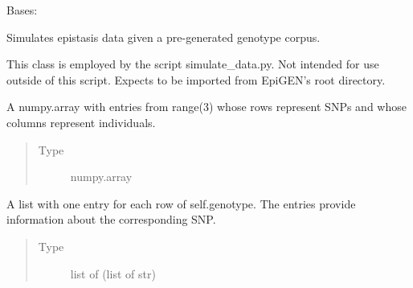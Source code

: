 \documentclass[a4paper,10pt,english]{sphinxhowto}
\begin{document}
\begin{fulllineitems}
\label{\detokenize{utils:utils.data_simulator.DataSimulator}}
Bases: 

Simulates epistasis data given a pre-generated genotype corpus.

This class is employed by the script simulate\_data.py.
Not intended for use outside of this script.
Expects to be imported from EpiGEN’s root directory.

\begin{fulllineitems}
\label{\detokenize{utils:utils.data_simulator.DataSimulator.genotype}}
A numpy.array with entries from range(3) whose rows represent SNPs and whose
columns represent individuals.
\begin{quote}\begin{description}
\item[{Type}] \leavevmode
numpy.array

\end{description}\end{quote}

\end{fulllineitems}


\begin{fulllineitems}
\label{\detokenize{utils:utils.data_simulator.DataSimulator.snps}}
A list with one entry for each row of self.genotype. The entries provide information
about the corresponding SNP.
\begin{quote}\begin{description}
\item[{Type}] \leavevmode
list of (list of str)

\end{description}\end{quote}


\end{fulllineitems}
\end{fulllineitems}
\end{document}
